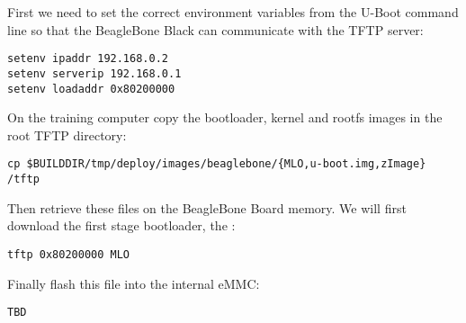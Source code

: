 First we need to set the correct environment variables from the U-Boot command
line so that the BeagleBone Black can communicate with the TFTP server:
\begin{verbatim}
setenv ipaddr 192.168.0.2
setenv serverip 192.168.0.1
setenv loadaddr 0x80200000
\end{verbatim}

On the training computer copy the bootloader, kernel and rootfs images in the
root TFTP directory:
\begin{verbatim}
cp $BUILDDIR/tmp/deploy/images/beaglebone/{MLO,u-boot.img,zImage} /tftp
\end{verbatim}

Then retrieve these files on the BeagleBone Board memory. We will first download
the first stage bootloader, the :
\begin{verbatim}
tftp 0x80200000 MLO
\end{verbatim}

Finally flash this file into the internal eMMC:
\begin{verbatim}
TBD
\end{verbatim}
